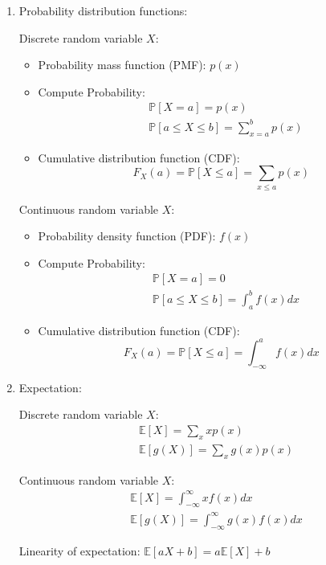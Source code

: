 \documentclass{article}
\begin{document}
\begin{enumerate}
	\item Probability distribution functions:
		\vspace*{-0.5\baselineskip}
		\begin{multicols}{2}
			Discrete random variable $X$:
			\begin{itemize}
				\item Probability mass function (PMF): $p(x)$
				\item Compute Probability:
					\begin{align*}
						&\mathbb{P}[X=a]=p(x) \\
						&\mathbb{P}[a\leq X\leq b]=\sum_{x=a}^{b}p(x)
					\end{align*}
				\item Cumulative distribution function (CDF):
					$$F_X(a)=\mathbb{P}[X\leq a]=\sum_{x\leq a}p(x)$$
			\end{itemize}
			
			\columnbreak
			Continuous random variable $X$:
			\begin{itemize}
				\item Probability density function (PDF): $f(x)$
				\item Compute Probability:
					\begin{align*}
						&\mathbb{P}[X=a]=0 \\
						&\mathbb{P}[a\leq X\leq b]=\int_{a}^{b}f(x)dx
					\end{align*}
				\item Cumulative distribution function (CDF):
					$$F_X(a)=\mathbb{P}[X\leq a]=\int_{-\infty}^{a}f(x)dx$$
			\end{itemize}
		\end{multicols}
		
	\vspace*{-\baselineskip}
	\item Expectation:
		\vspace*{-0.5\baselineskip}
		\begin{multicols}{2}
			Discrete random variable $X$:
			\begin{align*}
				&\mathbb{E}[X]=\sum_x xp(x) \\
				&\mathbb{E}[g(X)]=\sum_x g(x)p(x)
			\end{align*}
			
			\columnbreak
			Continuous random variable $X$:
			\begin{align*}
				&\mathbb{E}[X]=\int_{-\infty}^{\infty} xf(x)dx \\
				&\mathbb{E}[g(X)]=\int_{-\infty}^{\infty} g(x)f(x)dx
			\end{align*}
		\end{multicols}
		\vspace*{-0.5\baselineskip}
		Linearity of expectation: $\mathbb{E}[aX+b]=a\mathbb{E}[X]+b$
		

\end{enumerate}
\end{document}
